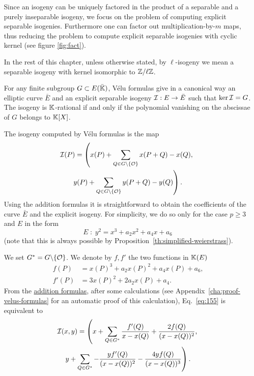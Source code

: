 Since an isogeny can be uniquely factored in the product of a
separable and a purely inseparable isogeny, we focus on the problem of
computing explicit separable isogenies. Furthermore one can factor out
multiplication-by-$m$ maps, thus reducing the problem to compute
explicit separable isogenies with cyclic kernel (see figure
\ref{fig:fact}).

In the rest of this chapter, unless otherwise stated, by
$\ell$-isogeny we mean a separable isogeny with kernel isomorphic to
$\mathbb{Z}/\ell\mathbb{Z}$.


For any finite subgroup $G \subset E(\bar{\mathbb{K}})$, Vélu formulas
\cite{velu71} give in a canonical way an elliptic curve $\bar{E}$ and
an explicit separable isogeny $\mathcal{I}:E\rightarrow \bar{E}$ such that
$\ker\mathcal{I}=G$. The isogeny is $\mathbb{K}$-rational if and only if the polynomial
vanishing on the abscissae of $G$ belongs to $\mathbb{K}[X]$.

The isogeny computed by Vélu formulas is the map
\begin{multline}
  \label{eq:155}
  \mathcal{I}(P) = \left(x(P) + \sum_{Q\in G\backslash\{\mathcal{O}\}}x(P+Q) - x(Q),\right.\\
    \left.y(P) + \sum_{Q\in G\backslash\{\mathcal{O}\}}y(P+Q) - y(Q)\right)
  \text{.}
\end{multline}
Using the addition formulas it is straightforward to obtain the
coefficients of the curve $\bar{E}$ and the explicit isogeny.  For
simplicity, we do so only for the case $p\ge3$ and $E$ in the form
\begin{equation}
  \label{eq:160}
  E \;:\; y^2 =  x^3 + a_2x^2 + a_4x + a_6
\end{equation}
(note that this is always possible by
Proposition~\ref{th:simplified-weierstrass}). 

We set $G^\ast=G\backslash\{\mathcal{O}\}$. We denote by $f,f'$ the two
functions in $\mathbb{K}(E)$
\begin{equation}
  \label{eq:162}
  \begin{aligned}
    f(P) &= x(P)^3 + a_2x(P)^2 + a_4x(P) + a_6
    \text{,}\\
    f'(P) &= 3x(P)^2 + 2a_2x(P) + a_4
    \text{.}
  \end{aligned}
\end{equation}
From the \hyperref[eq:121]{addition formulas}, after some calculations
(see Appendix~\ref{cha:proof-velus-formulas} for an automatic proof of
this calculation), Eq.~\eqref{eq:155} is equivalent to
\begin{multline}
  \label{eq:161}
  \mathcal{I}(x,y) = \left(x + \sum_{Q\in G^\ast} \frac{f'(Q)}{x-x(Q)} + \frac{2f(Q)}{(x-x(Q))^2}\text{,}\right.\\
  \left.y + \sum_{Q\in G^\ast} -\frac{yf'(Q)}{(x-x(Q))^2} - \frac{4yf(Q)}{(x-x(Q))^3}\right)
  \text{.}
\end{multline}

